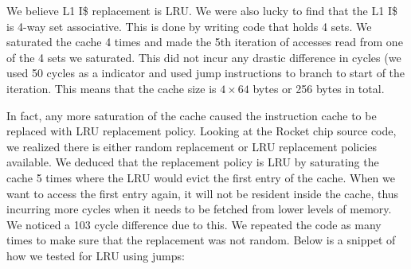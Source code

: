 \documentclass[11pt]{article}
\begin{document}
We believe L1 I\$ replacement is LRU. We were also lucky to find that the L1 I\$ is 4-way set associative. This is done by writing code that holds 4 sets. We saturated the cache 4 times and made the 5th iteration of accesses read from one of the 4 sets we saturated. This did not incur any drastic difference in cycles (we used 50 cycles as a indicator and used jump instructions to branch to start of the iteration. This means that the cache size is $4 \times 64$ bytes or 256 bytes in total.

In fact, any more saturation of the cache caused the instruction cache to be replaced with LRU replacement policy. Looking at the Rocket chip source code, we realized there is either random replacement or LRU replacement policies available. We deduced that the replacement policy is LRU by saturating the cache 5 times where the LRU would evict the first entry of the cache. When we want to access the first entry again, it will not be resident inside the cache, thus incurring more cycles when it needs to be fetched from lower levels of memory. We noticed a 103 cycle difference due to this. We repeated the code as many times to make sure that the replacement was not random. Below is a snippet of how we tested for LRU using jumps:
\end{document}
